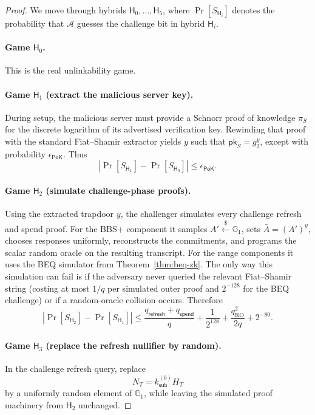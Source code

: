 \documentclass[11pt]{article}
\theoremstyle{definitionstyle}
\theoremstyle{plain}
\begin{document}
\begin{proof}
We move through hybrids $\mathsf{H}_0,\dots,\mathsf{H}_5$, where $\Pr[S_{\mathsf{H}_i}]$ denotes the probability that $\mathcal{A}$ guesses the challenge bit in hybrid $\mathsf{H}_i$.

\paragraph{Game $\mathsf{H}_0$.} This is the real unlinkability game.

\paragraph{Game $\mathsf{H}_1$ (extract the malicious server key).} During setup, the malicious server must provide a Schnorr proof of knowledge $\pi_S$ for the discrete logarithm of its advertised verification key. Rewinding that proof with the standard Fiat--Shamir extractor yields $y$ such that $\mathsf{pk}_S = g_2^y$, except with probability $\epsilon_{\mathsf{PoK}}$. Thus
\[
|\Pr[S_{\mathsf{H}_1}] - \Pr[S_{\mathsf{H}_0}]| \le \epsilon_{\mathsf{PoK}}.
\]

\paragraph{Game $\mathsf{H}_2$ (simulate challenge-phase proofs).} Using the extracted trapdoor $y$, the challenger simulates every challenge refresh and spend proof. For the BBS+ component it samples $A' \xleftarrow{\$} \mathbb{G}_1$, sets $\bar{A}=(A')^y$, chooses responses uniformly, reconstructs the commitments, and programs the scalar random oracle on the resulting transcript. For the range components it uses the BEQ simulator from Theorem~\ref{thm:beq-zk}. The only way this simulation can fail is if the adversary never queried the relevant Fiat--Shamir string (costing at most $1/q$ per simulated outer proof and $2^{-128}$ for the BEQ challenge) or if a random-oracle collision occurs. Therefore
\[
|\Pr[S_{\mathsf{H}_2}] - \Pr[S_{\mathsf{H}_1}]| \le \frac{q_{\mathsf{refresh}}+q_{\mathsf{spend}}}{q} + \frac{1}{2^{128}} + \frac{q_{\text{RO}}^2}{2q} + 2^{-80}.
\]

\paragraph{Game $\mathsf{H}_3$ (replace the refresh nullifier by random).} In the challenge refresh query, replace
\[
N_T = k_{\mathsf{sub}}^{(b)} H_T
\]
by a uniformly random element of $\mathbb{G}_1$, while leaving the simulated proof machinery from $\mathsf{H}_2$ unchanged.


\end{proof}
\end{document}

